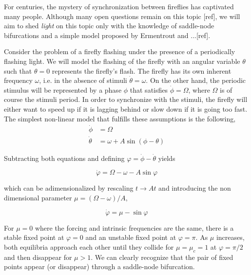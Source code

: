 \begin{exmp}
    For centuries, the mystery of synchronization between fireflies has
    captivated many people. Although many open questions remain on this topic [ref],
    we will aim to shed {\em light} on this topic only with the knowledge of saddle-node bifurcations
    and a simple model proposed by Ermentrout and ...[ref]. 
    
    Consider the problem
    of a firefly flashing under the presence of a periodically flashing light.
    We will model the flashing of the firefly with an angular variable $\theta$
    such that $\theta = 0$ represents the firefly's flash. The firefly has its 
    own inherent frequency $\omega$, i.e. in the absence of stimuli 
    $\dot{\theta} = \omega$. On the other hand, the periodic stimulus will be
    represented by a phase $\phi$ that satisfies $\dot{\phi} = \Omega$, where 
    $\Omega$ is of course the stimuli period. In order to synchronize with the
    stimuli, the firefly will either want to speed up if it is lagging behind
    or slow down if it is going too fast. The simplest non-linear model that
    fulfills these assumptions is the following,
    \begin{align*}
        \dot{\phi} &= \Omega \\
        \dot{\theta} &= \omega + A \sin(\phi -  \theta)
    \end{align*}

    Subtracting both equations and defining $\varphi = \dot{\phi} - \dot{\theta}$
    yields 

    \begin{equation*}
        \dot{\varphi} = \Omega - \omega - A \sin \varphi
    \end{equation*}

    which can be adimensionalized by rescaling $t \to At$ and introducing
    the non dimensional parameter $\mu = (\Omega - \omega)/A$,

    \begin{equation}
        \dot{\varphi} = \mu - \sin \varphi
        \label{eq:pre_bif_sn_exmp}
    \end{equation}

    For $\mu = 0$ where the forcing and intrinsic frequencies are the same, there
    is a stable fixed point at $\varphi = 0$ and an unstable fixed point at $\varphi = \pi$.
    As $\mu$ increases, both equilibria approach each other until they collide for $\mu=\mu_c=1$
    at $\varphi = \pi/2$
    and then disappear for $\mu > 1$. We can clearly recognize that the pair of fixed
    points appear (or disappear) through a saddle-node bifurcation.
    

\end{exmp}
